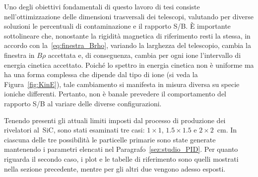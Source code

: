 Uno degli obiettivi fondamentali di questo lavoro di tesi consiste nell'ottimizzazione delle dimensioni trasversali dei telescopi, valutando per diverse soluzioni le percentuali di contaminazione e il rapporto S/B.
È importante sottolineare che, nonostante la rigidità magnetica di riferimento resti la stessa, in accordo con la~\ref{eq:finestra_Brho}, variando la larghezza del telescopio, cambia la finestra in $B \rho$ accettata e, di conseguenza, cambia per ogni ione l'intervallo di energia cinetica accettato.
Poiché lo spettro in energia cinetica non è uniforme ma ha una forma complessa che dipende dal tipo di ione (si veda la Figura~\ref{fig:KinE}), tale cambiamento si manifesta in misura diversa su specie ioniche differenti.
Pertanto, non è banale prevedere il comportamento del rapporto S/B al variare delle diverse configurazioni.

Tenendo presenti gli attuali limiti imposti dal processo di produzione dei rivelatori al~SiC, sono stati esaminati tre casi: $1 \times 1$, $1.5 \times 1.5$ e $2 \times 2$~cm. 
In ciascuna delle tre possibilità le particelle primarie sono state generate mantenendo i parametri elencati nel Paragrafo~\ref{sez:studio_PID}.
Per quanto riguarda il secondo caso, i plot e le tabelle di riferimento sono quelli mostrati nella sezione precedente, mentre per gli altri due vengono adesso esposti.

